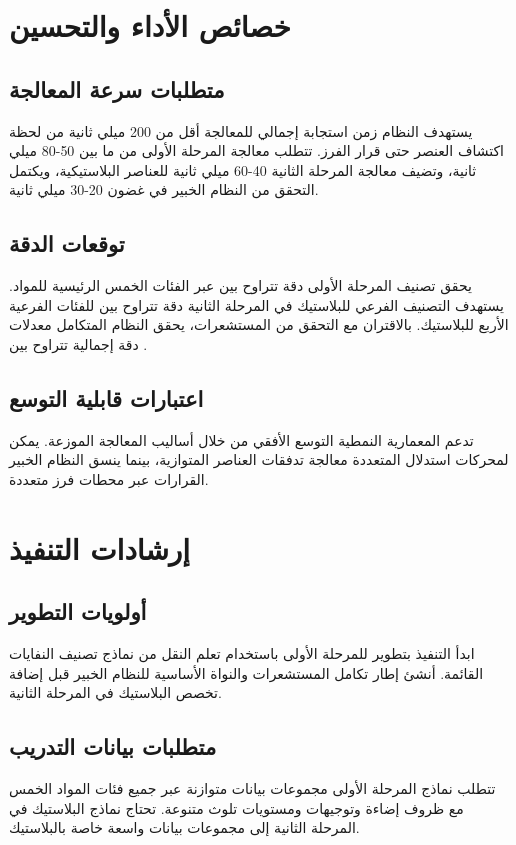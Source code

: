 \documentclass[11pt, a4paper]{article}
\begin{document}
\begin{RTL}
\section{خصائص الأداء والتحسين}
\subsection{متطلبات سرعة المعالجة}
يستهدف النظام زمن استجابة إجمالي للمعالجة أقل من 200 ميلي ثانية من لحظة اكتشاف العنصر حتى قرار الفرز. تتطلب معالجة المرحلة الأولى من  ما بين 50-80 ميلي ثانية، وتضيف معالجة المرحلة الثانية 40-60 ميلي ثانية للعناصر البلاستيكية، ويكتمل التحقق من النظام الخبير في غضون 20-30 ميلي ثانية.

\subsection{توقعات الدقة}
يحقق تصنيف المرحلة الأولى دقة تتراوح بين  عبر الفئات الخمس الرئيسية للمواد. يستهدف التصنيف الفرعي للبلاستيك في المرحلة الثانية دقة تتراوح بين  للفئات الفرعية الأربع للبلاستيك. بالاقتران مع التحقق من المستشعرات، يحقق النظام المتكامل معدلات دقة إجمالية تتراوح بين .

\subsection{اعتبارات قابلية التوسع}
تدعم المعمارية النمطية التوسع الأفقي من خلال أساليب المعالجة الموزعة. يمكن لمحركات استدلال  المتعددة معالجة تدفقات العناصر المتوازية، بينما ينسق النظام الخبير القرارات عبر محطات فرز متعددة.

\section{إرشادات التنفيذ}
\subsection{أولويات التطوير}
ابدأ التنفيذ بتطوير  للمرحلة الأولى باستخدام تعلم النقل من نماذج تصنيف النفايات القائمة. أنشئ إطار تكامل المستشعرات والنواة الأساسية للنظام الخبير قبل إضافة تخصص البلاستيك في المرحلة الثانية.

\subsection{متطلبات بيانات التدريب}
تتطلب نماذج المرحلة الأولى مجموعات بيانات متوازنة عبر جميع فئات المواد الخمس مع ظروف إضاءة وتوجيهات ومستويات تلوث متنوعة. تحتاج نماذج البلاستيك في المرحلة الثانية إلى مجموعات بيانات واسعة خاصة بالبلاستيك.


\end{RTL}
\end{document}
